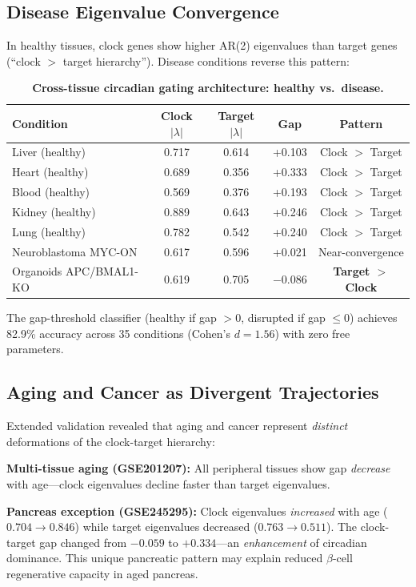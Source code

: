 \documentclass[11pt,a4paper]{article}
\begin{document}
\subsection{Disease Eigenvalue Convergence}

In healthy tissues, clock genes show higher AR(2) eigenvalues than target genes (``clock $>$ target hierarchy''). Disease conditions reverse this pattern:

\begin{table}[H]
\centering
\caption{\textbf{Cross-tissue circadian gating architecture: healthy vs.\ disease.}}
\label{tab:tissue_atlas}
\begin{tabular}{lcccc}
\toprule
Condition & Clock $|\lambda|$ & Target $|\lambda|$ & Gap & Pattern \\
\midrule
Liver (healthy) & 0.717 & 0.614 & +0.103 & Clock $>$ Target \\
Heart (healthy) & 0.689 & 0.356 & +0.333 & Clock $>$ Target \\
Blood (healthy) & 0.569 & 0.376 & +0.193 & Clock $>$ Target \\
Kidney (healthy) & 0.889 & 0.643 & +0.246 & Clock $>$ Target \\
Lung (healthy) & 0.782 & 0.542 & +0.240 & Clock $>$ Target \\
Neuroblastoma MYC-ON & 0.617 & 0.596 & +0.021 & Near-convergence \\
Organoids APC/BMAL1-KO & 0.619 & 0.705 & $-$0.086 & \textbf{Target $>$ Clock} \\
\bottomrule
\end{tabular}
\end{table}

The gap-threshold classifier (healthy if gap $> 0$, disrupted if gap $\leq 0$) achieves 82.9\% accuracy across 35 conditions (Cohen's $d = 1.56$) with zero free parameters.

\subsection{Aging and Cancer as Divergent Trajectories}

Extended validation revealed that aging and cancer represent \textit{distinct} deformations of the clock-target hierarchy:

\textbf{Multi-tissue aging (GSE201207):} All peripheral tissues show gap \textit{decrease} with age---clock eigenvalues decline faster than target eigenvalues.

\textbf{Pancreas exception (GSE245295):} Clock eigenvalues \textit{increased} with age ($0.704 \rightarrow 0.846$) while target eigenvalues decreased ($0.763 \rightarrow 0.511$). The clock-target gap changed from $-0.059$ to $+0.334$---an \textit{enhancement} of circadian dominance. This unique pancreatic pattern may explain reduced $\beta$-cell regenerative capacity in aged pancreas.
\end{document}
